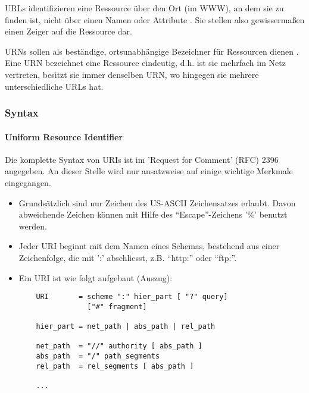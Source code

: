 URLs  identifizieren eine Ressource \"uber den Ort (im WWW), an dem sie zu
finden ist, nicht \"uber einen Namen oder Attribute \cite{rfc2396}. Sie stellen also 
gewisserma{\ss}en einen Zeiger auf die Ressource dar.

URNs  sollen als best\"andige, ortsunabh\"angige Bezeichner f\"ur Ressourcen dienen \cite{rfc2141}. Eine URN
bezeichnet eine Ressource eindeutig, d.h. ist sie mehrfach im Netz vertreten, besitzt sie immer
denselben URN, wo hingegen sie mehrere unterschiedliche URLs hat.

\subsubsection{Syntax}

\paragraph{Uniform Resource Identifier}

Die komplette Syntax von URIs ist im  'Request for Comment' (RFC) 2396 \cite{rfc2396} angegeben. 
An dieser Stelle wird
nur ansatzweise auf einige wichtige Merkmale eingegangen.

\begin{itemize}

\item Grunds\"atzlich sind nur Zeichen des US-ASCII Zeichensatzes erlaubt. Davon abweichende Zeichen k\"onnen
  mit Hilfe des ``Escape''-Zeichens '\%' benutzt werden.

\item Jeder URI beginnt mit dem Namen eines Schemas, bestehend aus einer Zeichenfolge, die mit ':' abschliesst, 
z.B. ``http:'' oder ``ftp:''.

\item Ein URI ist wie folgt aufgebaut (Auszug):

  \begin{verbatim}
    URI       = scheme ":" hier_part [ "?" query] 
                ["#" fragment]
    
    hier_part = net_path | abs_path | rel_path
    
    net_path  = "//" authority [ abs_path ]
    abs_path  = "/" path_segments
    rel_path  = rel_segments [ abs_path ]

    ...

  \end{verbatim}

\end{itemize}

